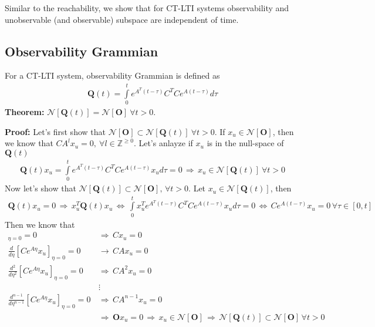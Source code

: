 \documentclass[twoside]{article}
\begin{document}
%
Similar to the reachability, we show that for CT-LTI systems
observability and unobservable (and observable) subspace
are independent of time. 

\subsection{Observability Grammian}

For a CT-LTI system, observability Grammian is defined as
%
\begin{align*}
    \textbf{Q}(t) = \int\limits_{0}^{t} e^{A^T (t - \tau)} C^T C e^{A (t - \tau)}  d \tau 
\end{align*}
%
\textbf{Theorem:} $\mathcal{N}[ \textbf{Q}(t) ] = \mathcal{N}[ \mathbf{O} ] \ \forall t > 0$. 

\textbf{Proof:} Let's first show that $\mathcal{N}[ \mathbf{O} ] \subset \mathcal{N}[ \textbf{Q}(t) ] \ \forall t > 0$. 
If $x_u \in \mathcal{N}[ \mathbf{O} ]$, then we know that $C A^{l} x_u = 0, \ \forall l \in \mathbb{Z}^{\geq 0}$. Let's anlayze 
if $x_u$ is in the null-space of $\textbf{Q}(t)$
%
\begin{align*}
    \textbf{Q}(t) x_u = \int\limits_{0}^{t} e^{A^T (t - \tau)} C^T C e^{A (t - \tau)} x_u d \tau
    = 0 \, \Rightarrow \, x_u \in \mathcal{N}[ \textbf{Q}(t) ] \ \forall t > 0
\end{align*}
%
Now let's show that $\mathcal{N}[ \textbf{Q}(t) ] \subset \mathcal{N}[ \mathbf{O} ], \, \forall t > 0$.
Let $x_u \in \mathcal{N}[ \textbf{Q}(t) ]$, then
\begin{align*}
    \textbf{Q}(t) x_u = 0 \, \Rightarrow \, x_u^T \textbf{Q}(t) x_u \, \iff \, \int\limits_{0}^{t} x_u^T e^{A^T (t - \tau)} C^T C e^{A (t - \tau)} x_u d \tau
    = 0 \, \iff \, C e^{A (t - \tau)} x_u = 0 \, \forall \tau \in [0 , t]
\end{align*}
%
Then we know that 
%
\begin{align*}
  [ C e^{A \eta} x_u]_{\eta = 0} = 0 \, &\Rightarrow \, C x_u = 0
  \\
  \frac{d}{d\eta}[ C e^{A \eta} x_u ]_{\eta = 0} = 0 \, &\rightarrow \, C A x_u = 0
  \\
  \frac{d^2}{d\eta^2}[ C e^{A \eta} x_u ]_{\eta = 0} = 0 \, &\Rightarrow \, C A^2 x_u = 0
  \\
  &\vdots
    \\
    \frac{d^{n-1}}{d\eta^{n-1}}[ C e^{A \eta} x_u ]_{\eta = 0} = 0 \, &\Rightarrow \, C A^{n-1} x_u = 0
    \\
    &\Rightarrow \, \mathbf{O} x_u = 0 \, \Rightarrow \, x_u \in \mathcal{N}[ \mathbf{O} ]
    \, \Rightarrow \, \mathcal{N}[ \textbf{Q}(t) ] \subset \mathcal{N}[ \mathbf{O} ] \, \forall t > 0
\end{align*}

\end{document}
